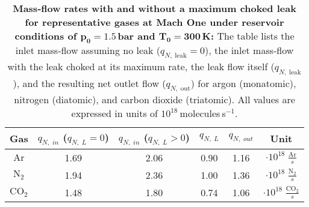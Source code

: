 \begin{table}[ht]
  \centering
  \renewcommand{\arraystretch}{1.4} %
  \begin{tabular}{|c||c||c|c|c||c|}
    \hline
    Gas & $q_{N,\;in}$ ($q_{N,\;L} = 0$) & $q_{N,\;in}$ ($q_{N,\;L} > 0$) & $q_{N,\;L}$ & $q_{N,\;out}$ & Unit\\ \hline \hline
    $\text{Ar}$ & 1.69 & 2.06 & 0.90 & 1.16 & $\cdot 10^{18} \; \frac{\text{Ar}}{s}$ \\ \hline
    $\text{N}_2$ & 1.94 & 2.36 & 1.00 & 1.36 & $\cdot 10^{18}\; \frac{\text{N}_2}{s}$ \\ \hline
    $\text{CO}_2$ & 1.48 & 1.80 & 0.74 & 1.06 & $\cdot 10^{18}\; \frac{\text{CO}_2}{s}$ \\ \hline
  \end{tabular}
   \caption[Mass‐flow rates with and without a choked leak for representative gases at Mach One under reservoir conditions of $p_0=1.5$\,bar and $T_0=300$\,K]{%
    \textbf{Mass‐flow rates with and without a maximum choked leak for representative gases at Mach One under reservoir conditions of $\bm{p_0=1.5}$\,bar and $\bm{T_0=300}$\,K:}  
    The table lists the inlet mass‐flow assuming no leak ($q_{N,\;\text{leak}}=0$), the inlet mass‐flow with the leak choked at its maximum rate, the leak flow itself ($q_{N,\;\text{leak}}$), and the resulting net outlet flow ($q_{N,\;\text{out}}$) for argon (monatomic), nitrogen (diatomic), and carbon dioxide (triatomic). All values are expressed in units of $10^{18}$ molecules s$^{-1}$.  
  }
  \label{tab:massflow_discussion}
\end{table}
